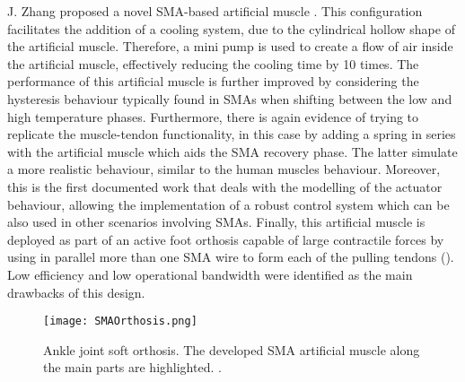 J. Zhang proposed a novel SMA-based artificial muscle \cite{Zhang2013a}. This configuration facilitates the addition of a cooling system, due to the cylindrical hollow shape of the artificial muscle. Therefore, a mini pump is used to create a flow of air inside the artificial muscle, effectively reducing the cooling time by 10 times. The performance of this artificial muscle is further improved by considering the hysteresis behaviour typically found in SMAs when shifting between the low and high temperature phases. Furthermore, there is again evidence of trying to replicate the muscle-tendon functionality, in this case by adding a spring in series with the artificial muscle which aids the SMA recovery phase. The latter simulate a more realistic behaviour, similar to the human muscles behaviour. Moreover, this is the first documented work that deals with the modelling of the actuator behaviour, allowing the implementation of a robust control system which can be also used in other scenarios involving SMAs. Finally, this artificial muscle is deployed as part of an active foot orthosis capable of large contractile forces by using in parallel more than one SMA wire to form each of the pulling tendons (). Low efficiency and low operational bandwidth were identified as the main drawbacks of this design.

\begin{figure}[hbtp!]
    \centering
    \texttt{[image: SMAOrthosis.png]}
    \caption[Ankle joint soft orthosis. The developed SMA artificial muscle along the main parts are highlighted.]{Ankle joint soft orthosis. The developed SMA artificial muscle along the main parts are highlighted. \cite{Zhang2013a}. }
    \label{fig:SMA_orthosis}
\end{figure}

